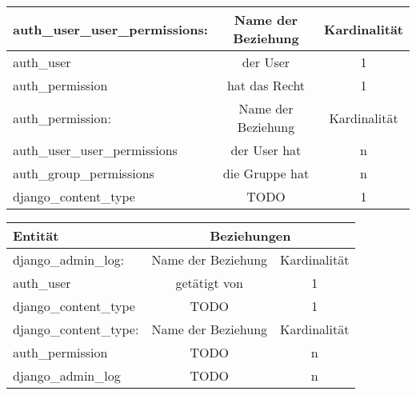 \begin{tabular}[ht]{|l||c|c|}
  auth\_user\_user\_permissions:  & Name der Beziehung &  Kardinalit\"at\\
  \hline\hline
  auth\_user & der User & 1 \\
  \hline
  auth\_permission & hat das Recht & 1 \\
  \hline\hline\hline 
  
  auth\_permission:  & Name der Beziehung &  Kardinalit\"at\\
  \hline\hline
  auth\_user\_user\_permissions & der User hat  & n \\
  \hline
  auth\_group\_permissions & die Gruppe hat & n \\
  \hline
  django\_content\_type & TODO & 1 \\
  \hline
\end{tabular}

\begin{tabular}[ht]{|l||c|c|}
  \hline
  Entit\"at & \multicolumn{2}{c|}{Beziehungen} \\
  \hline\hline\hline
  
  django\_admin\_log:  & Name der Beziehung &  Kardinalit\"at\\
  \hline\hline
  auth\_user & getätigt von  & 1 \\
  \hline
  django\_content\_type & TODO & 1 \\
  \hline\hline\hline
  
  django\_content\_type:  & Name der Beziehung &  Kardinalit\"at\\
  \hline\hline
  auth\_permission & TODO  & n \\
  \hline
  django\_admin\_log & TODO & n \\
  \hline\hline\hline
\end{tabular}